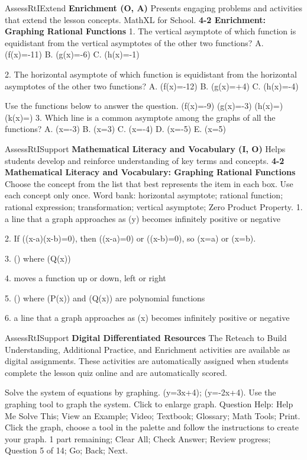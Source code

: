 \documentclass{article}
\newenvironment{te-addendum}[2]{}{}     %
\newcommand{\answer}[1]{}               %
\newcommand{\placeholder}[2]{}          %
\begin{document}
\begin{te-addendum}{Assess}{RtIExtend}
\textbf{Enrichment (O, A)} Presents engaging problems and activities that extend the lesson concepts. MathXL for School.
\textbf{4-2 Enrichment: Graphing Rational Functions}
1. The vertical asymptote of which function is equidistant from the vertical asymptotes of the other two functions?
A. (f(x)=-11)
B. (g(x)=-6)
C. (h(x)=-1)
\answer{1. B}
2. The horizontal asymptote of which function is equidistant from the horizontal asymptotes of the other two functions?
A. (f(x)=-12)
B. (g(x)=+4)
C. (h(x)=-4)
\answer{2. C}
Use the functions below to answer the question.
(f(x)=-9)
(g(x)=-3)
(h(x)=)
(k(x)=)
3. Which line is a common asymptote among the graphs of all the functions?
A. (x=-3)
B. (x=3)
C. (x=-4)
D. (x=-5)
E. (x=5)
\answer{3. B}
\end{te-addendum}
\begin{te-addendum}{Assess}{RtISupport}
\textbf{Mathematical Literacy and Vocabulary (I, O)} Helps students develop and reinforce understanding of key terms and concepts.
\textbf{4-2 Mathematical Literacy and Vocabulary: Graphing Rational Functions}
Choose the concept from the list that best represents the item in each box. Use each concept only once.
Word bank: horizontal asymptote; rational function; rational expression; transformation; vertical asymptote; Zero Product Property.
1. a line that a graph approaches as (y) becomes infinitely positive or negative
\answer{vertical asymptote}
2. If ((x-a)(x-b)=0), then ((x-a)=0) or ((x-b)=0), so (x=a) or (x=b).
\answer{Zero Product Property}
3. () where (Q(x))
\answer{rational expression}
4. moves a function up or down, left or right
\answer{transformation}
5. () where (P(x)) and (Q(x)) are polynomial functions
\answer{rational function}
6. a line that a graph approaches as (x) becomes infinitely positive or negative
\answer{horizontal asymptote}
\end{te-addendum}
\begin{te-addendum}{Assess}{RtISupport}
\textbf{Digital Differentiated Resources}
The Reteach to Build Understanding, Additional Practice, and Enrichment activities are available as digital assignments. These activities are automatically assigned when students complete the lesson quiz online and are automatically scored.
\placeholder{illustration}{Black tablet showing graphing exercise for system y=3x+4,y=-2x+4. Blank x,y grid -10 to10 with tick labels every2, Help menu on right, graph tool controls below.}
Solve the system of equations by graphing. (y=3x+4); (y=-2x+4).
Use the graphing tool to graph the system. Click to enlarge graph.
Question Help: Help Me Solve This; View an Example; Video; Textbook; Glossary; Math Tools; Print.
Click the graph, choose a tool in the palette and follow the instructions to create your graph.
1 part remaining; Clear All; Check Answer; Review progress; Question 5 of 14; Go; Back; Next.
\end{te-addendum}
\end{document}
